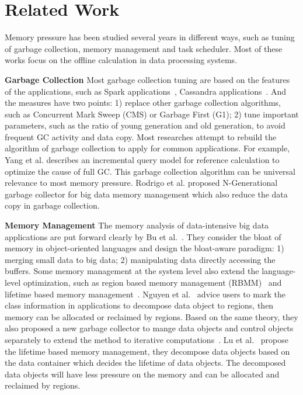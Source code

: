 \section{Related Work}

Memory pressure has been studied several years in different ways, such as tuning of garbage collection, memory management and task scheduler. Most of these works focus on the offline calculation in data processing systems. 

\textbf{Garbage Collection} Most garbage collection tuning are based on the features of the applications, such as Spark applications~\cite{www:spark-tuning}, Cassandra applications~\cite{www:cassandra}. And the measures have two points: 1) replace other garbage collection algorithms, such as Concurrent Mark Sweep (CMS) or Garbage First (G1); 2) tune important parameters, such as the ratio of young generation and old generation, to avoid frequent GC activity and data copy. Most researches attempt to rebuild the algorithm of garbage collection to apply for common applications. For example, Yang et al.\cite{yang:fullgc} describes an incremental query model for reference calculation to optimize the cause of full GC. This garbage collection algorithm can be universal relevance to most memory pressure. Rodrigo et al.\cite{rodigo:NGeneration} proposed N-Generational garbage collector for big data memory management which also reduce the data copy in garbage collection.

\textbf{Memory Management} The memory analysis of data-intensive big data applications are put forward clearly by Bu et al.~\cite{bu:bloat}. They consider the bloat of memory in object-oriented languages and design the bloat-aware paradigm: 1) merging small data to big data; 2) manipulating data directly accessing the buffers. Some memory management at the system level also extend the language-level optimization, such as region based memory management (RBMM)~\cite{nguyen2015facade, nguyen:yak} and lifetime based memory management~\cite{lulu:deca}. Nguyen et al.~\cite{nguyen2015facade} advice users to mark the class information in applications to decompose data object to regions, then memory can be allocated or reclaimed by regions. Based on the same theory, they also proposed a new garbage collector to mange data objects and control objects separately to extend the method to iterative computations~\cite{nguyen:yak}. Lu et al.~\cite{lulu:deca} propose the lifetime based memory management, they decompose data objects based on the data container which decides the lifetime of data objects. The decomposed data objects will have less pressure on the memory and can be allocated and reclaimed by regions.


